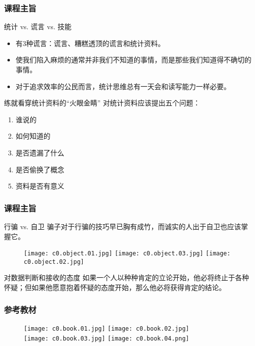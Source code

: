 \begin{frame}[fragile]
  \frametitle{课程主旨}
  \begin{block}{统计 vs. 谎言 vs. 技能}
    \begin{itemize}
      \item 有3种谎言：谎言、糟糕透顶的谎言和统计资料。
      \item 使我们陷入麻烦的通常并非我们不知道的事情，而是那些我们知道得不确切的事情。
      \item 对于追求效率的公民而言，统计思维总有一天会和读写能力一样必要。
    \end{itemize}
  \end{block}
  \pause
  \vspace{-0.5em}
  \begin{block}{练就看穿统计资料的“火眼金睛”}
    对统计资料应该提出五个问题：
    \begin{enumerate}
      \item 谁说的
      \item 如何知道的
      \item 是否遗漏了什么
      \item 是否偷换了概念
      \item 资料是否有意义
    \end{enumerate}
  \end{block}
\end{frame}

\begin{frame}
  \frametitle{课程主旨}
  \begin{block}{行骗 vs. 自卫}
    骗子对于行骗的技巧早已胸有成竹，而诚实的人出于自卫也应该掌握它。
  \end{block}
  \vspace{-0.5em}
  \begin{figure}
    \centering
    \texttt{[image: c0.object.01.jpg]}
    \texttt{[image: c0.object.03.jpg]}
    \texttt{[image: c0.object.02.jpg]}
  \end{figure}
  \vspace{-0.5em}
  \begin{block}{对数据判断和接收的态度}
    如果一个人以种种肯定的立论开始，他必将终止于各种怀疑；但如果他愿意抱着怀疑的态度开始，那么他必将获得肯定的结论。
  \end{block}
\end{frame}

\begin{frame}
  \frametitle{参考教材}
  \begin{figure}
    \centering
    \texttt{[image: c0.book.01.jpg]}\qquad
    \texttt{[image: c0.book.02.jpg]}\\
    \texttt{[image: c0.book.03.jpg]}\qquad
    \texttt{[image: c0.book.04.png]}
  \end{figure}
\end{frame}

